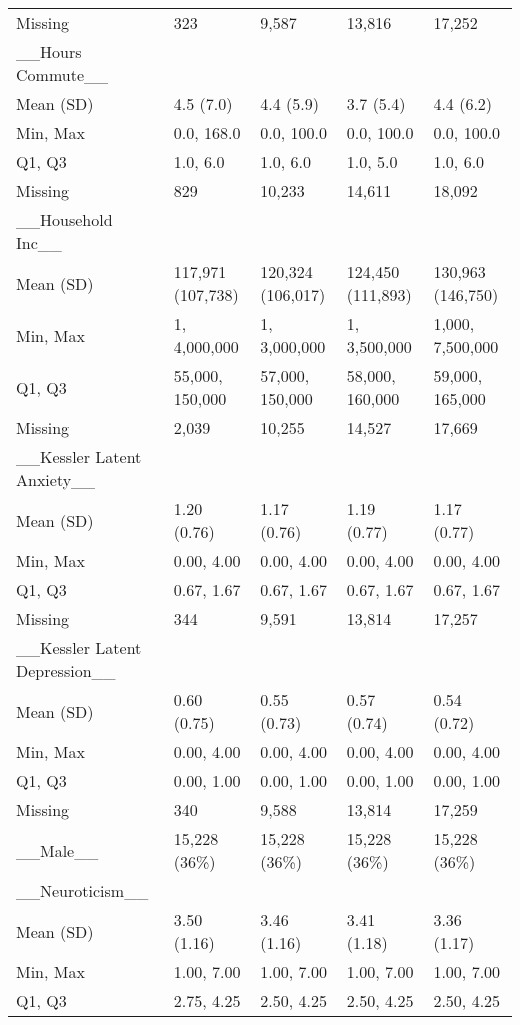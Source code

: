 \documentclass[
  single column]{article}
\begin{document}
\begin{longtable}[t]{lllll}
Missing & 323 & 9,587 & 13,816 & 17,252\\
\_\_Hours Commute\_\_ &   ~~&   ~~&   ~~& ~~\\
\addlinespace
Mean (SD) & 4.5 (7.0) & 4.4 (5.9) & 3.7 (5.4) & 4.4 (6.2)\\
Min, Max & 0.0, 168.0 & 0.0, 100.0 & 0.0, 100.0 & 0.0, 100.0\\
Q1, Q3 & 1.0, 6.0 & 1.0, 6.0 & 1.0, 5.0 & 1.0, 6.0\\
Missing & 829 & 10,233 & 14,611 & 18,092\\
\_\_Household Inc\_\_ &   ~~&   ~~&   ~~& ~~\\
\addlinespace
Mean (SD) & 117,971 (107,738) & 120,324 (106,017) & 124,450 (111,893) & 130,963 (146,750)\\
Min, Max & 1, 4,000,000 & 1, 3,000,000 & 1, 3,500,000 & 1,000, 7,500,000\\
Q1, Q3 & 55,000, 150,000 & 57,000, 150,000 & 58,000, 160,000 & 59,000, 165,000\\
Missing & 2,039 & 10,255 & 14,527 & 17,669\\
\_\_Kessler Latent Anxiety\_\_ &   ~~&   ~~&   ~~&   ~~\\
\addlinespace
Mean (SD) & 1.20 (0.76) & 1.17 (0.76) & 1.19 (0.77) & 1.17 (0.77)\\
Min, Max & 0.00, 4.00 & 0.00, 4.00 & 0.00, 4.00 & 0.00, 4.00\\
Q1, Q3 & 0.67, 1.67 & 0.67, 1.67 & 0.67, 1.67 & 0.67, 1.67\\
Missing & 344 & 9,591 & 13,814 & 17,257\\
\_\_Kessler Latent Depression\_\_ &   ~~&   ~~&   ~~&   ~~\\
\addlinespace
Mean (SD) & 0.60 (0.75) & 0.55 (0.73) & 0.57 (0.74) & 0.54 (0.72)\\
Min, Max & 0.00, 4.00 & 0.00, 4.00 & 0.00, 4.00 & 0.00, 4.00\\
Q1, Q3 & 0.00, 1.00 & 0.00, 1.00 & 0.00, 1.00 & 0.00, 1.00\\
Missing & 340 & 9,588 & 13,814 & 17,259\\
\_\_Male\_\_ & 15,228 (36\%) & 15,228 (36\%) & 15,228 (36\%) & 15,228 (36\%)\\
\addlinespace
\_\_Neuroticism\_\_ &   ~~&   ~~&   ~~&   ~~\\
Mean (SD) & 3.50 (1.16) & 3.46 (1.16) & 3.41 (1.18) & 3.36 (1.17)\\
Min, Max & 1.00, 7.00 & 1.00, 7.00 & 1.00, 7.00 & 1.00, 7.00\\
Q1, Q3 & 2.75, 4.25 & 2.50, 4.25 & 2.50, 4.25 & 2.50, 4.25\\

\end{longtable}
\end{document}
